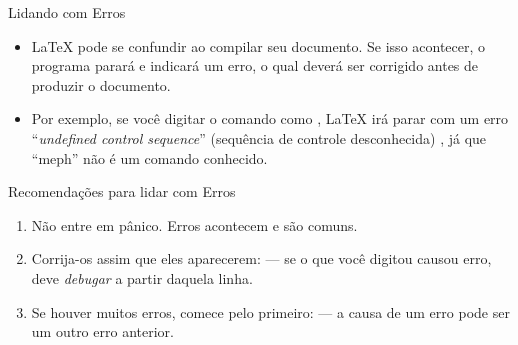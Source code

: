 \documentclass{beamer}
\begin{document}
\begin{frame}[fragile]{Lidando com Erros}
\begin{itemize}
\item \LaTeX{} pode se confundir ao compilar seu documento. Se isso acontecer,
o programa parará e indicará um erro, o qual deverá ser corrigido antes de produzir o documento.
\item Por exemplo, se você digitar o comando  como ,
\LaTeX{} irá parar com um erro ``\emph{undefined control sequence}'' (sequência de
controle desconhecida) , já que ``meph'' não é um comando conhecido.
\end{itemize}
\begin{block}{Recomendações para lidar com Erros}
\begin{enumerate}
\item Não entre em pânico. Erros  acontecem e são comuns.
\item Corrija-os assim que eles aparecerem: --- se o que você digitou causou
erro, deve \emph{debugar} a partir daquela linha.
\item Se houver muitos erros, comece pelo primeiro:  --- a causa de um erro
pode ser um outro erro anterior.
\end{enumerate}
\end{block}
\end{frame}
\end{document}
